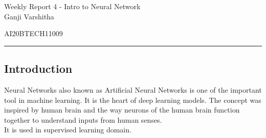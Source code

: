 \documentclass[12pt,letterpaper, onecolumn]{exam}
\begin{document}
\newtheorem{theorem}{Theorem}[section]
\newtheorem{problem}{Problem}
\newtheorem{proposition}{Proposition}[section]
\newtheorem{lemma}{Lemma}[section]
\newtheorem{corollary}[theorem]{Corollary}
\newtheorem{example}{Example}[section]
\newtheorem{definition}[problem]{Definition}

\newcommand{\BEQA}{\begin{eqnarray}}
\newcommand{\EEQA}{\end{eqnarray}}
\newcommand{\define}{\stackrel{\triangle}{=}}

\raggedbottom
\setlength{\parindent}{0pt}
\providecommand{\mbf}{\mathbf}
\providecommand{\norm}[1]{\lVert#1\rVert}
\providecommand{\pr}[1]{\ensuremath{\Pr\left(#1\right)}}
\providecommand{\qfunc}[1]{\ensuremath{Q\left(#1\right)}}
\providecommand{\sbrak}[1]{\ensuremath{{}\left[#1\right]}}
\providecommand{\lsbrak}[1]{\ensuremath{{}\left[#1\right.}}
\providecommand{\rsbrak}[1]{\ensuremath{{}\left.#1\right]}}
\providecommand{\brak}[1]{\ensuremath{\left(#1\right)}}
\providecommand{\lbrak}[1]{\ensuremath{\left(#1\right.}}
\providecommand{\rbrak}[1]{\ensuremath{\left.#1\right)}}
\providecommand{\cbrak}[1]{\ensuremath{\left\{#1\right\}}}
\providecommand{\lcbrak}[1]{\ensuremath{\left\{#1\right.}}
\providecommand{\rcbrak}[1]{\ensuremath{\left.#1\right\}}}
\let\vec\mathbf




\begingroup  
    \centering
    
    \LARGE Weekly Report 4 - Intro to Neural Network\\[0.5em]
    
    \large Ganji Varshitha\par
    \large AI20BTECH11009\par
\endgroup
\rule{\textwidth}{0.4pt}
\pointsdroppedatright   %
\printanswers
\newcommand\Solution{
  \textbf{Solution:}\\}
\newcommand{\myvec}[1]{\ensuremath{\begin{bmatrix}#1\end{bmatrix}}}

 \subsection*{Introduction}
Neural Networks also known as Artificial Neural Networks is one of the important tool in machine learning. It is the heart of deep learning models. The concept was inspired by human brain and the way neurons of the human brain function together to understand inputs from human senses. \\
It is used in supervised learning domain.
\end{document}
